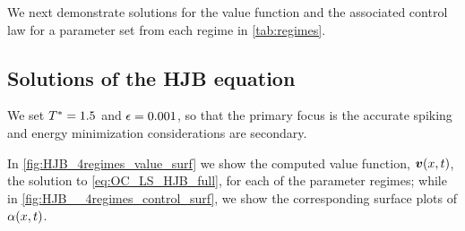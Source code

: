 We next demonstrate solutions for the value function and the associated
control law for a parameter set from each regime in \cref{tab:regimes}.

\subsection{Solutions of the HJB equation} 
We set ${ T^* }=1.5$ and ${\epsilon} = 0.001$, so that the primary focus is the accurate
spiking and energy minimization considerations are secondary.

In \cref{fig:HJB_4regimes_value_surf} we show the computed value
function, ${ \boldsymbol{v} }(x,t)$, the solution to \cref{eq:OC_LS_HJB_full}, for each of the
parameter regimes; while in \cref{fig:HJB__4regimes_control_surf}, we show the
corresponding surface plots of $\alpha(x,t)$. 

